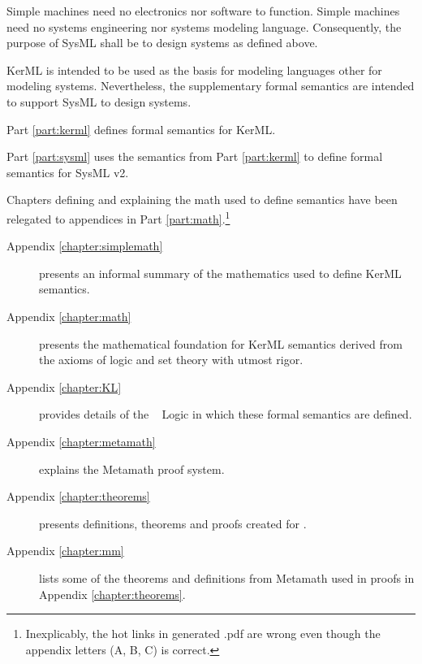 


Simple machines need no electronics nor software to function.
Simple machines need no systems engineering nor systems modeling language.
Consequently, the purpose of SysML \cite{SysML} shall be to design systems as defined above.

KerML \cite{KerML} is intended to be used as the basis for modeling languages other for modeling systems.
Nevertheless, the supplementary formal semantics are intended to support SysML to design systems.

Part \ref{part:kerml} defines formal semantics for KerML.

Part \ref{part:sysml} uses the semantics from Part \ref{part:kerml} to define formal semantics for SysML v2.

Chapters defining and explaining the math used to define semantics have been relegated to appendices in Part \ref{part:math}.\footnote{Inexplicably, the hot links in generated .pdf are wrong even though the appendix letters (A, B, C) is correct.} 
\begin{description}
\item[Appendix \ref{chapter:simplemath} ]  presents an informal summary of the mathematics used to define KerML semantics. 
\item[Appendix \ref{chapter:math} ] presents the mathematical foundation for KerML semantics derived from the axioms of logic and set theory with utmost rigor. 
\item[ Appendix \ref{chapter:KL}] provides details of the \logicid~ Logic in which these formal semantics are defined.
\item[Appendix \ref{chapter:metamath}]  explains the Metamath proof system.  
\item[Appendix \ref{chapter:theorems} ] presents definitions, theorems and proofs created for \logicid. 
\item[Appendix \ref{chapter:mm}] lists some of the theorems and definitions from Metamath
used in proofs in Appendix \ref{chapter:theorems}.
\end{description}

 
   



